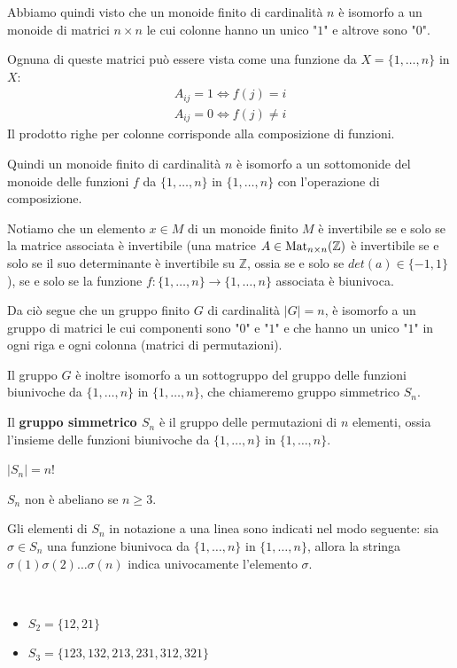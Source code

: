 \documentclass[../main.tex]{subfiles}
\begin{document}
Abbiamo quindi visto che un monoide finito di cardinalità $n$ è isomorfo a un monoide di matrici $n \times n$ le cui colonne hanno un unico "$1$" e altrove sono "$0$".

Ognuna di queste matrici può essere vista come una funzione da $X = \{1,\ldots,n\}$ in $X$:
\begin{gather*}
    A_{ij} = 1 \iff f(j) = i\\
    A_{ij} = 0 \iff f(j) \neq i
\end{gather*}
Il prodotto righe per colonne corrisponde alla composizione di funzioni.

Quindi un monoide finito di cardinalità $n$ è isomorfo a un sottomonide del monoide delle funzioni $f$ da $\{1,\ldots,n\}$ in $\{1,\ldots,n\}$ con l'operazione di composizione.

Notiamo che un elemento $x \in M$ di un monoide finito $M$ è invertibile se e solo se la matrice associata è invertibile (una matrice $A \in \operatorname{Mat}_{n \times n} (\mathbb{Z})$ è invertibile se e solo se il suo determinante è invertibile su $\mathbb{Z}$, ossia se e solo se $det(a) \in \{-1,1\}$), se e solo se la funzione $f:\{1,\ldots,n\} \to \{1,\ldots,n\}$ associata è biunivoca.

Da ciò segue che un gruppo finito $G$ di cardinalità $|G|=n$, è isomorfo a un gruppo di matrici le cui componenti sono "$0$" e "$1$" e che hanno un unico "$1$" in ogni riga e ogni colonna (matrici di permutazioni).

Il gruppo $G$ è inoltre isomorfo a un sottogruppo del gruppo delle funzioni biunivoche da $\{1,\ldots,n\}$ in $\{1,\ldots,n\}$, che chiameremo gruppo simmetrico $S_n$.

\begin{definition}
    Il \textbf{gruppo simmetrico $S_n$} è il gruppo delle permutazioni di $n$ elementi, ossia l'insieme delle funzioni biunivoche da $\{1,\ldots,n\}$ in $\{1,\ldots,n\}$.
    \begin{note}
        $|S_n| = n!$
    \end{note}
    \begin{note}
        $S_n$ non è abeliano se $n \geq 3$.
    \end{note}
\end{definition}

Gli elementi di $S_n$ in notazione a una linea sono indicati nel modo seguente: sia $\sigma \in S_n$ una funzione biunivoca da $\{1,\ldots,n\}$ in $\{1,\ldots,n\}$, allora la stringa $\sigma(1)\sigma(2)\ldots\sigma(n)$ indica univocamente l'elemento $\sigma$.
\begin{example}
    \
    \begin{itemize}
        \item $S_2 = \{12,21\}$
        \item $S_3 = \{123,132,213,231,312,321\}$
    \end{itemize}
\end{example}
\end{document}
